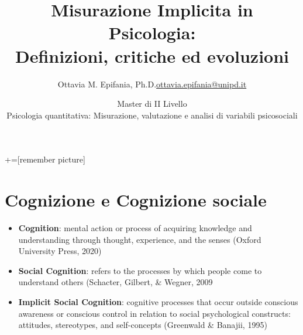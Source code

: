 \documentclass{beamer}
\title[Misurazione implicita]{Misurazione Implicita in Psicologia: \\ Definizioni, critiche ed evoluzioni}
\date[PSQT, 2024]{Master di II Livello \\ Psicologia quantitativa: Misurazione, valutazione e analisi di variabili psicosociali }
\institute[]{18 luglio 2024, Padova}
\author[Ottavia M. Epifania]{\texorpdfstring{Ottavia M. Epifania, Ph.D.\newline\url{ottavia.epifania@unipd.it}}{Author}}
\begin{document}
	+=[remember picture]
	


\begin{frame}[plain]
    \maketitle
\end{frame}


\section{Cognizione e Cognizione sociale}


\begin{frame}
	\begin{itemize}
		\item \textbf{Cognition}: mental action or process of acquiring knowledge and understanding through thought, experience, and the senses (Oxford University Press, 2020)
		\pause
		\item  \textbf{Social Cognition}:  refers to the processes by which
		people come to understand others (Schacter, Gilbert, \& Wegner, 2009
		\pause
		\item \textbf{Implicit Social Cognition}: cognitive processes that occur outside conscious awareness or conscious control in relation to social psychological constructs: attitudes, stereotypes, and self-concepts (Greenwald \& Banajii, 1995)
	\end{itemize}
\end{frame}
\end{document}
